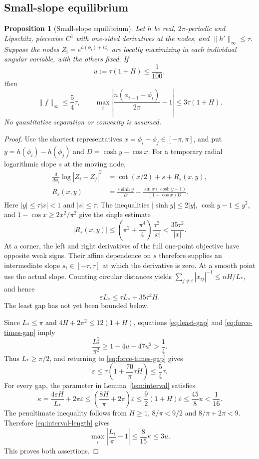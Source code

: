 \documentclass[11pt,reqno]{amsart}
\numberwithin{equation}{section}
\newtheorem{proposition}[theorem]{Proposition}
\theoremstyle{definition}
\theoremstyle{remark}
\begin{document}
\subsection{Small-slope equilibrium}
\begin{proposition}[Small-slope equilibrium]\label{prop:small-slope}
Let $h$ be real, $2\pi$-periodic and Lipschitz, piecewise $C^1$ with one-sided derivatives at the nodes, and $\lVert h'\rVert_\infty\le\tau$. Suppose the nodes
$Z_i=e^{h(\phi_i)+i\phi_i}$ are locally maximizing in each individual angular variable, with the others fixed. If
\[
u:=\tau(1+H)\le\frac1{100},
\]
then
\begin{equation}\label{eq:small-slope}
\lVert f\rVert_\infty\le\frac54\tau,\qquad
\max_i\left|\frac{n(\phi_{i+1}-\phi_i)}{2\pi}-1\right|
\le3\tau(1+H).
\end{equation}
No quantitative separation or convexity is assumed.
\end{proposition}
\begin{proof}
Use the shortest representatives $x=\phi_i-\phi_j\in[-\pi,\pi]$, and put
$y=h(\phi_i)-h(\phi_j)$ and $D=\cosh y-\cos x$. For a temporary radial logarithmic slope $s$ at the moving node,
\begin{align*}
\frac d{d\phi_i}\log|Z_i-Z_j|^2
&=\cot(x/2)+s+R_s(x,y),\\
R_s(x,y)&=\frac{s\sinh y}{D}
-\frac{\sin x(\cosh y-1)}{(1-\cos x)D}.
\end{align*}
Here $|y|\le\tau|x|<1$ and $|s|\le\tau$. The inequalities
$|\sinh y|\le2|y|$, $\cosh y-1\le y^2$, and
$1-\cos x\ge2x^2/\pi^2$ give the single estimate
\begin{equation}\label{eq:pairwise-defect}
|R_s(x,y)|\le\left(\pi^2+\frac{\pi^4}{4}\right)\frac{\tau^2}{|x|}
<\frac{35\tau^2}{|x|}.
\end{equation}
At a corner, the left and right derivatives of the full one-point objective have opposite weak signs. Their affine dependence on $s$ therefore supplies an intermediate slope $s_i\in[-\tau,\tau]$ at which the derivative is zero. At a smooth point use the actual slope. Counting circular distances yields
$\sum_{j\ne i}|x_{ij}|^{-1}\le nH/L_*$, and hence
\begin{equation}\label{eq:force-times-gap}
\varepsilon L_*\le\tau L_*+35\tau^2H.
\end{equation}
The least gap has not yet been bounded below.

Since $L_*\le\pi$ and $4H+2\pi^2\le12(1+H)$, equations \eqref{eq:least-gap} and \eqref{eq:force-times-gap} imply
\[
\frac{L_*^2}{\pi^2}\ge1-4u-47u^2>\frac14.
\]
Thus $L_*\ge\pi/2$, and returning to \eqref{eq:force-times-gap} gives
\[
\varepsilon\le\tau\left(1+\frac{70}{\pi}\tau H\right)\le\frac54\tau.
\]
For every gap, the parameter in Lemma~\ref{lem:interval} satisfies
\[
\kappa=\frac{4\varepsilon H}{L_*}+2\pi\varepsilon
\le\left(\frac{8H}{\pi}+2\pi\right)\varepsilon
\le\frac92(1+H)\varepsilon\le\frac{45}{8}u<\frac1{16}.
\]
The penultimate inequality follows from $H\ge1$, $8/\pi<9/2$ and $8/\pi+2\pi<9$. Therefore \eqref{eq:interval-length} gives
\[
\max_i\left|\frac{L_i}{\pi}-1\right|
\le\frac8{15}\kappa\le3u.
\]
This proves both assertions.
\end{proof}
\end{document}
